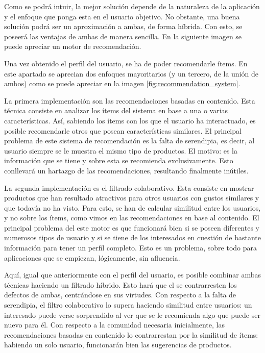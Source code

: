 Como se podrá intuir, la mejor solución depende de la naturaleza de la aplicación y el enfoque que ponga esta en el usuario objetivo. No obstante, una buena solución podrá ser un aproximación a ambas, de forma híbrida. Con esto, se poseerá las ventajas de ambas de manera sencilla. En la siguiente imagen se puede apreciar un motor de recomendación.


Una vez obtenido el perfil del usuario, se ha de poder recomendarle ítems. En este apartado se aprecian dos enfoques mayoritarios (y un tercero, de la unión de ambos) como se puede apreciar en la imagen \ref{fig:recommendation_system}.

La primera implementación son las recomendaciones basadas en contenido. Esta técnica consiste en analizar los ítems del sistema en base a una o varias características. Así, sabiendo los ítems con los que el usuario ha interactuado, es posible recomendarle otros que posean características similares. El principal problema de este sistema de recomendación es la falta de serendipia, es decir, al usuario siempre se le muestra el mismo tipo de productos. El motivo: es la información que se tiene y sobre esta se recomienda exclusivamente. Esto conllevará un hartazgo de las recomendaciones, resultando finalmente inútiles.

La segunda implementación es el filtrado colaborativo. Esta consiste en mostrar productos que han resultado atractivos para otros usuarios con gustos similares y que todavía no ha visto. Para esto, se han de calcular similitud entre los usuarios, y no sobre los ítems, como vimos en las recomendaciones en base al contenido. El principal problema del este motor es que funcionará bien si se poseen diferentes y numerosos tipos de usuario y si se tiene de los interesados en cuestión de bastante información para tener un perfil completo. Esto es un problema, sobre todo para aplicaciones que se empiezan, lógicamente, sin afluencia.

Aquí, igual que anteriormente con el perfil del usuario, es posible combinar ambas técnicas haciendo un filtrado híbrido. Esto hará que el se contrarresten los defectos de ambas, centrándose en sus virtudes. Con respecto a la falta de serendipia, el filtro colaborativo lo supera haciendo similitud entre usuarios: un interesado puede verse sorprendido al ver que se le recomienda algo que puede ser nuevo para él. Con respecto a la comunidad necesaria inicialmente, las recomendaciones basadas en contenido lo contrarrestan por la similitud de ítems: habiendo un solo usuario, funcionarán bien las sugerencias de productos.

